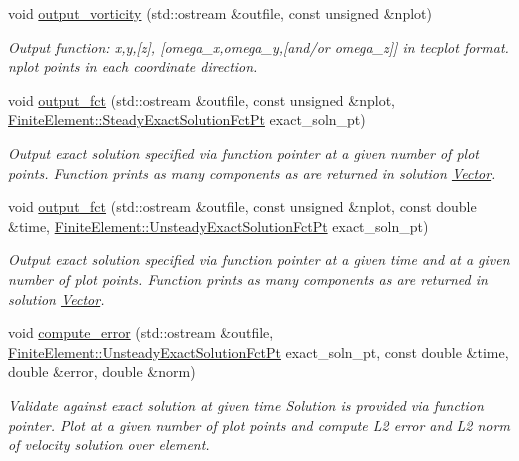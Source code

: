 \begin{DoxyCompactItemize}
void \hyperlink{classoomph_1_1GeneralisedNewtonianNavierStokesEquations_a6f60781b794442f501d32cb7d8cde2f3}{output\+\_\+vorticity} (std\+::ostream \&outfile, const unsigned \&nplot)
\begin{DoxyCompactList}\small\item\em Output function\+: x,y,\mbox{[}z\mbox{]}, \mbox{[}omega\+\_\+x,omega\+\_\+y,\mbox{[}and/or omega\+\_\+z\mbox{]}\mbox{]} in tecplot format. nplot points in each coordinate direction. \end{DoxyCompactList}\item 
void \hyperlink{classoomph_1_1GeneralisedNewtonianNavierStokesEquations_a1139ee45fa212ab52c9cb8e1e0ade323}{output\+\_\+fct} (std\+::ostream \&outfile, const unsigned \&nplot, \hyperlink{classoomph_1_1FiniteElement_a690fd33af26cc3e84f39bba6d5a85202}{Finite\+Element\+::\+Steady\+Exact\+Solution\+Fct\+Pt} exact\+\_\+soln\+\_\+pt)
\begin{DoxyCompactList}\small\item\em Output exact solution specified via function pointer at a given number of plot points. Function prints as many components as are returned in solution \hyperlink{classoomph_1_1Vector}{Vector}. \end{DoxyCompactList}\item 
void \hyperlink{classoomph_1_1GeneralisedNewtonianNavierStokesEquations_adf4652164a709749ba63c8d7fff7efdd}{output\+\_\+fct} (std\+::ostream \&outfile, const unsigned \&nplot, const double \&time, \hyperlink{classoomph_1_1FiniteElement_ad4ecf2b61b158a4b4d351a60d23c633e}{Finite\+Element\+::\+Unsteady\+Exact\+Solution\+Fct\+Pt} exact\+\_\+soln\+\_\+pt)
\begin{DoxyCompactList}\small\item\em Output exact solution specified via function pointer at a given time and at a given number of plot points. Function prints as many components as are returned in solution \hyperlink{classoomph_1_1Vector}{Vector}. \end{DoxyCompactList}\item 
void \hyperlink{classoomph_1_1GeneralisedNewtonianNavierStokesEquations_aeacfccb073da112f363e8fad6a88d035}{compute\+\_\+error} (std\+::ostream \&outfile, \hyperlink{classoomph_1_1FiniteElement_ad4ecf2b61b158a4b4d351a60d23c633e}{Finite\+Element\+::\+Unsteady\+Exact\+Solution\+Fct\+Pt} exact\+\_\+soln\+\_\+pt, const double \&time, double \&error, double \&norm)
\begin{DoxyCompactList}\small\item\em Validate against exact solution at given time Solution is provided via function pointer. Plot at a given number of plot points and compute L2 error and L2 norm of velocity solution over element. \end{DoxyCompactList}\item 

\end{DoxyCompactItemize}
